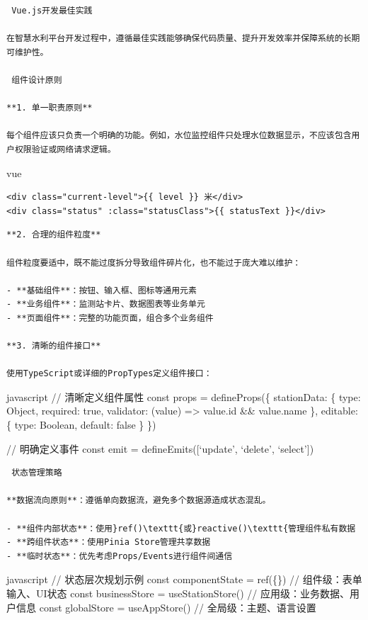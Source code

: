 {{\begin{lstlisting}
 Vue.js开发最佳实践

在智慧水利平台开发过程中，遵循最佳实践能够确保代码质量、提升开发效率并保障系统的长期可维护性。

 组件设计原则

**1. 单一职责原则**

每个组件应该只负责一个明确的功能。例如，水位监控组件只处理水位数据显示，不应该包含用户权限验证或网络请求逻辑。
\end{lstlisting}

vue

\begin{verbatim}
<div class="current-level">{{ level }} 米</div>
<div class="status" :class="statusClass">{{ statusText }}</div>
\end{verbatim}

\begin{lstlisting}
**2. 合理的组件粒度**

组件粒度要适中，既不能过度拆分导致组件碎片化，也不能过于庞大难以维护：

- **基础组件**：按钮、输入框、图标等通用元素
- **业务组件**：监测站卡片、数据图表等业务单元  
- **页面组件**：完整的功能页面，组合多个业务组件

**3. 清晰的组件接口**

使用TypeScript或详细的PropTypes定义组件接口：
\end{lstlisting}

javascript // 清晰定义组件属性 const props = defineProps(\{ stationData: \{ type: Object, required: true, validator: (value) =\textgreater{} value.id \&\& value.name \}, editable: \{ type: Boolean, default: false \} \})

// 明确定义事件 const emit = defineEmits({[}`update', `delete', `select'{]})

\begin{lstlisting}
 状态管理策略

**数据流向原则**：遵循单向数据流，避免多个数据源造成状态混乱。

- **组件内部状态**：使用}ref()\texttt{或}reactive()\texttt{管理组件私有数据
- **跨组件状态**：使用Pinia Store管理共享数据
- **临时状态**：优先考虑Props/Events进行组件间通信
\end{lstlisting}

javascript // 状态层次规划示例 const componentState = ref(\{\}) // 组件级：表单输入、UI状态 const businessStore = useStationStore() // 应用级：业务数据、用户信息 const globalStore = useAppStore() // 全局级：主题、语言设置

}}
